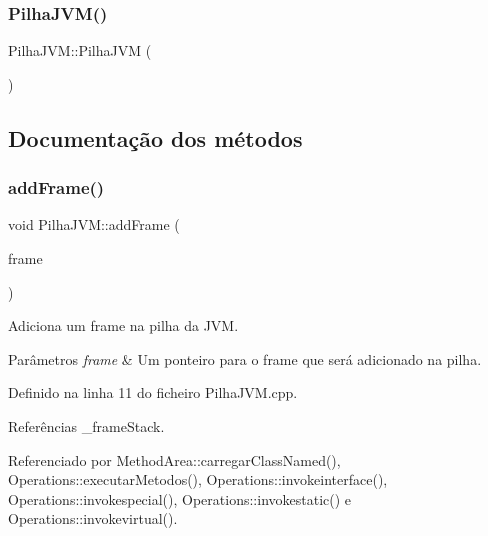 \subsubsection{\texorpdfstring{Pilha\+J\+V\+M()}{PilhaJVM()}\hspace{0.1cm}{\footnotesize\ttfamily [2/2]}}
{\footnotesize\ttfamily Pilha\+J\+V\+M\+::\+Pilha\+J\+VM (\begin{DoxyParamCaption}\item[{\hyperlink{classPilhaJVM}{Pilha\+J\+VM} const \&}]{ }\end{DoxyParamCaption})\hspace{0.3cm}{\ttfamily [private]}}



\subsection{Documentação dos métodos}
\mbox{\label{classPilhaJVM_a64d7185bc812d3c81e5270c54c212e07}} 
\subsubsection{\texorpdfstring{add\+Frame()}{addFrame()}}
{\footnotesize\ttfamily void Pilha\+J\+V\+M\+::add\+Frame (\begin{DoxyParamCaption}\item[{\hyperlink{classFrame}{Frame} $\ast$}]{frame }\end{DoxyParamCaption})}



Adiciona um frame na pilha da J\+VM. 


\begin{DoxyParams}{Parâmetros}
{\em frame} & Um ponteiro para o frame que será adicionado na pilha. \\
\hline
\end{DoxyParams}


Definido na linha 11 do ficheiro Pilha\+J\+V\+M.\+cpp.



Referências \+\_\+frame\+Stack.



Referenciado por Method\+Area\+::carregar\+Class\+Named(), Operations\+::executar\+Metodos(), Operations\+::invokeinterface(), Operations\+::invokespecial(), Operations\+::invokestatic() e Operations\+::invokevirtual().

